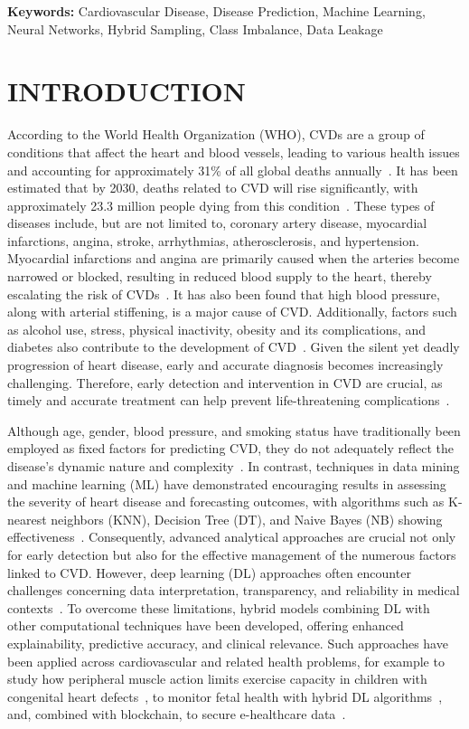 \documentclass[11pt,a4paper]{article}
\begin{document}
\medskip
\noindent\textbf{Keywords:} Cardiovascular Disease, Disease Prediction, Machine
Learning, Neural Networks, Hybrid Sampling, Class Imbalance, Data Leakage

\section{INTRODUCTION}

According to the World Health Organization (WHO), CVDs are a group of
conditions that affect the heart and blood vessels, leading to various
health issues and accounting for approximately 31\% of all global deaths
annually~\cite{who}. It has been estimated that by 2030, deaths related to
CVD will rise significantly, with approximately 23.3 million people dying
from this condition~\cite{mathers}. These types of diseases include, but are
not limited to, coronary artery disease, myocardial infarctions, angina,
stroke, arrhythmias, atherosclerosis, and hypertension. Myocardial
infarctions and angina are primarily caused when the arteries become
narrowed or blocked, resulting in reduced blood supply to the heart, thereby
escalating the risk of CVDs~\cite{mayo,libby}. It has also been found that
high blood pressure, along with arterial stiffening, is a major cause of
CVD. Additionally, factors such as alcohol use, stress, physical
inactivity, obesity and its complications, and diabetes also contribute to
the development of CVD~\cite{yusuf}. Given the silent yet deadly progression
of heart disease, early and accurate diagnosis becomes increasingly
challenging. Therefore, early detection and intervention in CVD are crucial,
as timely and accurate treatment can help prevent life-threatening
complications~\cite{virani}.

Although age, gender, blood pressure, and smoking status have traditionally
been employed as fixed factors for predicting CVD, they do not adequately
reflect the disease's dynamic nature and complexity~\cite{alaref,gavhane}.
In contrast, techniques in data mining and machine learning (ML) have
demonstrated encouraging results in assessing the severity of heart disease
and forecasting outcomes, with algorithms such as K-nearest neighbors (KNN),
Decision Tree (DT), and Naive Bayes (NB) showing
effectiveness~\cite{sheikabdullah}. Consequently, advanced analytical
approaches are crucial not only for early detection but also for the
effective management of the numerous factors linked to CVD. However, deep
learning (DL) approaches often encounter challenges concerning data
interpretation, transparency, and reliability in medical
contexts~\cite{currie}. To overcome these limitations, hybrid models
combining DL with other computational techniques have been developed,
offering enhanced explainability, predictive accuracy, and clinical
relevance. Such approaches have been applied across cardiovascular and
related health problems, for example to study how peripheral muscle action
limits exercise capacity in children with congenital heart
defects~\cite{chlif}, to monitor fetal health with hybrid DL
algorithms~\cite{hussain}, and, combined with blockchain, to secure
e-healthcare data~\cite{khan}.
\end{document}
